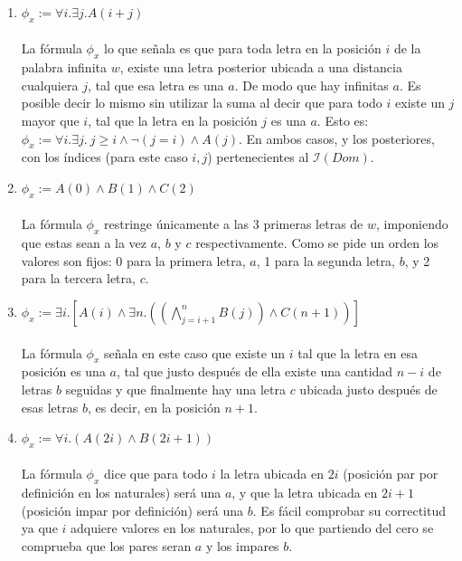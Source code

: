 \documentclass[letter]{article}
\begin{document}
	
	\begin{pregunta}{1} %
		\begin{enumerate}
		\item 
			$\phi_x := \forall i. \exists j. A(i + j)$\\\\
			La fórmula $\phi _x$ lo que señala es que para toda letra en la posición $i$ de la palabra infinita $w$, existe una letra posterior ubicada a una distancia cualquiera $j$, tal que esa letra es una $a$. De modo que hay infinitas $a$. Es posible decir lo mismo sin utilizar la suma al decir que para todo $i$ existe un $j$ mayor que $i$, tal que la letra en la posición $j$ es una $a$. Esto es: $\phi_x := \forall i. \exists j.\ j \geq i \wedge \neg(j=i) \wedge A(j)$. En ambos casos, y los posteriores, con los índices (para este caso $i, j$) pertenecientes al $\mathcal{I}(Dom)$.
		
		\item
			$\phi_x := A(0) \wedge B(1) \wedge C(2)$ \\\\
			La fórmula $\phi _x$ restringe únicamente a las 3 primeras letras de $w$, imponiendo que estas sean a la vez $a$, $b$ y $c$ respectivamente. Como se pide un orden los valores son fijos: 0 para la primera letra, $a$, 1 para la segunda letra, $b$, y 2 para la tercera letra, $c$.
			
		\item
			$\phi_x := \exists i. [A(i) \wedge \exists n. ((\bigwedge\limits_{j=i+1}^n B(j)) \wedge C(n + 1))]$ \\\\
			La fórmula $\phi _x$ señala en este caso que existe un $i$ tal que la letra en esa posición es una $a$, tal que justo después de ella existe una cantidad $n-i$ de letras $b$ seguidas y que finalmente hay una letra $c$ ubicada justo después de esas letras $b$, es decir, en la posición $n+1$.
		
		\item
			$\phi_x := \forall i. (A(2i) \wedge B(2i+1))$ \\\\
			La fórmula $\phi _x$ dice que para todo $i$ la letra ubicada en $2i$ (posición par por definición en los naturales) será una $a$, y que la letra ubicada en $2i + 1$ (posición impar por definición) será una $b$. Es fácil comprobar su correctitud ya que $i$ adquiere valores en los naturales, por lo que partiendo del cero se comprueba que los pares seran $a$ y los impares $b$.

		\end{enumerate}
	\end{pregunta}
	
\end{document}

